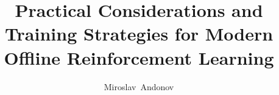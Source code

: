 \documentclass[a4paper,oneside,10pt,ngerman,english]{scrbook}
\begin{document}
\frontmatter


\title{Practical Considerations and Training Strategies for Modern Offline Reinforcement Learning}



\author{Miroslav~Andonov}



\end{document}
